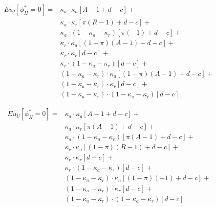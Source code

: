 \begin{align*}
	Eu_I[\phi^*_H=0] =& \kappa_a \cdot \kappa_a [ A - 1 + d - c] + \\
	&\kappa_a \cdot \kappa_r [ \pi(R-1) + d - c] + \\
	&\kappa_a \cdot (1-\kappa_a-\kappa_r) [ \pi(-1) + d - c] + \\
	&\kappa_r \cdot \kappa_a [ (1-\pi)(A-1) + d - c] + \\
	&\kappa_r \cdot \kappa_r [ d - c ] + \\
	&\kappa_r \cdot (1-\kappa_a-\kappa_r) [ d - c ] + \\
	&(1-\kappa_a-\kappa_r) \cdot \kappa_a [ (1-\pi)(A-1) + d - c] + \\
	&(1-\kappa_a-\kappa_r) \cdot \kappa_r [ d - c ] + \\
	&(1-\kappa_a-\kappa_r) \cdot (1-\kappa_a-\kappa_r) [ d - c ] 
\end{align*}

\begin{align*}
	Eu_U[\phi^*_H=0] =& \kappa_a \cdot \kappa_a [ A - 1 + d - c] + \\
	&\kappa_a \cdot \kappa_r [ \pi(A-1) + d - c] + \\
	&\kappa_a \cdot (1-\kappa_a-\kappa_r) [ \pi(A-1) + d - c] + \\
	&\kappa_r \cdot \kappa_a [ (1-\pi)(R-1) + d - c] + \\
	&\kappa_r \cdot \kappa_r [ d - c ] + \\
	&\kappa_r \cdot (1-\kappa_a-\kappa_r) [ d - c ] + \\
	&(1-\kappa_a-\kappa_r) \cdot \kappa_a [ (1-\pi)(-1) + d - c] + \\
	&(1-\kappa_a-\kappa_r) \cdot \kappa_r [ d - c ] + \\
	&(1-\kappa_a-\kappa_r) \cdot (1-\kappa_a-\kappa_r) [ d - c ] 
\end{align*}


